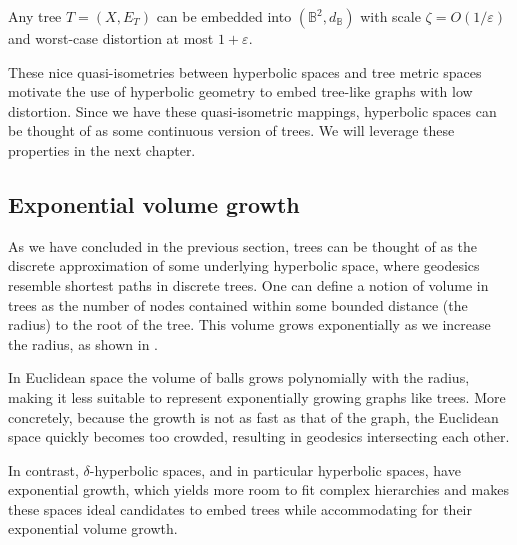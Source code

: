 \begin{proposition}[Sarkar]
    Any tree $T=(X,E_T)$ can be embedded into $(\mathbb{B}^2, d_\mathbb{B})$ with scale $\zeta = O(1/\varepsilon)$ and worst-case distortion at most $1 + \varepsilon$.
\end{proposition}

These nice quasi-isometries between hyperbolic spaces and tree metric spaces motivate the use of hyperbolic geometry to embed tree-like graphs with low distortion. Since we have these quasi-isometric mappings, hyperbolic spaces can be thought of as some continuous version of trees. We will leverage these properties in the next chapter. 

\subsection{Exponential volume growth}\label{sec:expGrowth}
As we have concluded in the previous section, trees can be thought of as the discrete approximation of some underlying hyperbolic space, where geodesics resemble shortest paths in discrete trees. One can define a notion of volume in trees as the number of nodes contained within some bounded distance (the radius) to the root of the tree. This volume grows exponentially as we increase the radius, as shown in .



In Euclidean space the volume of balls grows polynomially with the radius, making it less suitable to represent exponentially growing graphs like trees. More concretely, because the growth is not as fast as that of the graph, the Euclidean space quickly becomes too crowded, resulting in geodesics intersecting each other.

In contrast, $\delta$-hyperbolic spaces, and in particular hyperbolic spaces, have exponential growth, which yields more room to fit complex hierarchies and makes these spaces ideal candidates to embed trees while accommodating for their exponential volume growth. 






